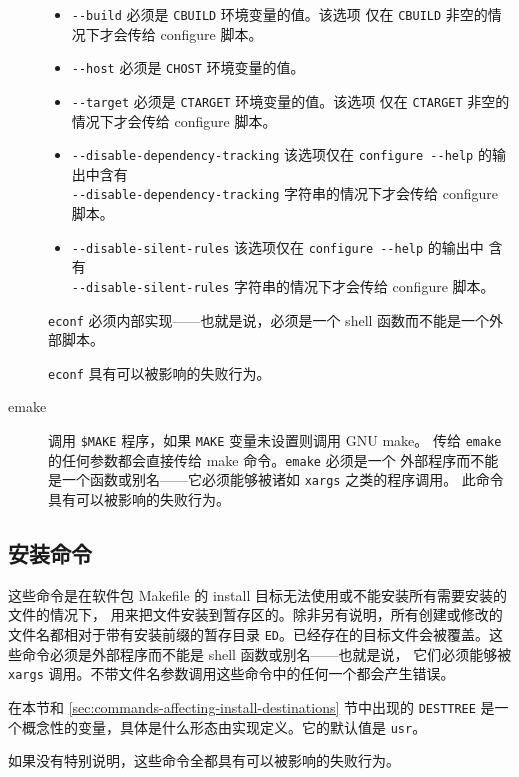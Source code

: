 \begin{description}
\begin{itemize}
    \item \texttt{-{}-build} 必须是 \texttt{CBUILD} 环境变量的值。该选项
        仅在 \texttt{CBUILD} 非空的情况下才会传给 configure 脚本。
    \item \texttt{-{}-host} 必须是 \texttt{CHOST} 环境变量的值。
    \item \texttt{-{}-target} 必须是 \texttt{CTARGET} 环境变量的值。该选项
        仅在 \texttt{CTARGET} 非空的情况下才会传给 configure 脚本。
    \item \texttt{-{}-disable-dependency-tracking} 该选项仅在 \texttt{configure -{}-help}
        的输出中含有 \\ \texttt{-{}-disable-dependency-tracking} 字符串的情况下才会传给 configure 脚本。
    \item \texttt{-{}-disable-silent-rules} 该选项仅在 \texttt{configure -{}-help} 的输出中
        含有 \\ \texttt{-{}-disable-silent-rules} 字符串的情况下才会传给 configure 脚本。
    \end{itemize}

    \texttt{econf} 必须内部实现——也就是说，必须是一个 shell 函数而不能是一个外部脚本。

    \texttt{econf} 具有可以被影响的失败行为。

\item[emake] 调用 \texttt{\$MAKE} 程序，如果 \texttt{MAKE} 变量未设置则调用 GNU make。
    传给 \texttt{emake} 的任何参数都会直接传给 make 命令。\texttt{emake} 必须是一个
    外部程序而不能是一个函数或别名——它必须能够被诸如 \texttt{xargs} 之类的程序调用。
    此命令具有可以被影响的失败行为。
\end{description}

\subsection{安装命令}
这些命令是在软件包 Makefile 的 install 目标无法使用或不能安装所有需要安装的文件的情况下，
用来把文件安装到暂存区的。除非另有说明，所有创建或修改的文件名都相对于带有安装前缀的暂存目录
\texttt{ED}。已经存在的目标文件会被覆盖。这些命令必须是外部程序而不能是 shell 函数或别名——也就是说，
它们必须能够被 \texttt{xargs} 调用。不带文件名参数调用这些命令中的任何一个都会产生错误。

在本节和 \ref{sec:commands-affecting-install-destinations} 节中出现的 \texttt{DESTTREE}
是一个概念性的变量，具体是什么形态由实现定义。它的默认值是 \texttt{usr}。

如果没有特别说明，这些命令全都具有可以被影响的失败行为。

